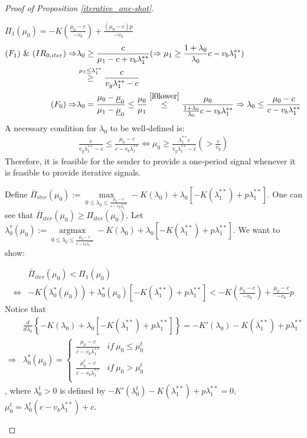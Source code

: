 \documentclass[11pt]{extarticle}
\DeclareMathOperator*{\argmax}{argmax}
\newcommand{\lra}{\Leftrightarrow}
\newcommand{\ra}{\Rightarrow}
\begin{document}
\begin{proof}[Proof of Proposition \ref{iterative_one-shot}]
\begin{enumerate}[i)]
		$\Pi_1(\mu_0) = -K(\frac{\mu_0-c}{-v_b})+\frac{(\mu_0-c)p}{-v_b}$
		\vspace{-10pt}	
		\begingroup
		\allowdisplaybreaks
		\begin{align}
		(F_1)~\&~(IR_{0,iter}) \ra& \lambda_0 \geq \frac{c}{\mu_1-c+v_b\lambda_1^{**}} (\ra \mu_1 \geq \frac{1+\lambda_{0}}{\lambda_{0}}c-v_b \lambda_{1}^{**}) \label{l0lower}\\
		&\overset{\mu_1 \leq \lambda_1^{**}}{\geq} \frac{c}{v_g\lambda_1^{**}-c} \nonumber \\
		(F_0) \ra& \lambda_0 = \frac{\mu_0-\underline{\mu}_0}{\mu_1-\underline{\mu}_0} \leq \frac{\mu_0}{\mu_1} \overset{\eqref{l0lower}}\leq \frac{\mu_0}{\frac{1+\lambda_0}{\lambda_0} c  - v_b \lambda_1^{**}} \ra \lambda_0 \leq \frac{\mu_0-c}{c-v_b\lambda_1^{**}} \nonumber 
		\end{align}
		\endgroup
		A necessary condition for $\lambda_0$ to be well-defined is:
		\begin{align}
		\frac{c}{v_g\lambda_1^{**}-c} \leq \frac{\mu_0-c}{c-v_b\lambda_1^{**}} \lra \mu_0 \geq \frac{\lambda_1^{**} c}{v_g\lambda_1^{**}-c} (>\frac{c}{v_g}) \nonumber 
		\end{align}
		Therefore, it is feasible for the sender to provide a one-period signal whenever it is feasible to provide iterative signals.
		
		Define $\bar{\Pi}_{iter}(\mu_0):= \max \limits_{0\leq \lambda_0 \leq \frac{\mu_0-c}{c-v_b\lambda_1^{**}}} -K(\lambda_0) + \lambda_0 \left[-K(\lambda_1^{**})+p \lambda_1^{**} \right]$. One can see that $\bar{\Pi}_{iter}(\mu_0) \geq \Pi_{iter}(\mu_0)$. Let $\lambda_0^*(\mu_0) := \argmax \limits_{0\leq \lambda_0 \leq \frac{\mu_0-c}{c-v_b\lambda_1^{**}}} -K(\lambda_0) + \lambda_0 \left[-K(\lambda_1^{**})+p \lambda_1^{**} \right]$. We want to show:
		\vspace{-20pt}
		
		\begin{align}
		&\bar{\Pi}_{iter}(\mu_0) < \Pi_1(\mu_0) \nonumber\\
		\lra &-K(\lambda_0^*(\mu_0)) + \lambda_0^*(\mu_0) \left[-K(\lambda_1^{**})+p \lambda_1^{**} \right] < -K(\frac{\mu_0-c}{-v_b})+\frac{\mu_0-c}{-v_b}p \label{comparison1iter}
		\end{align}
		Notice that
		\vspace{-35pt}
		\begin{align*}
		&\frac{d}{d \lambda_0}\left\{ -K(\lambda_0) + \lambda_0 \left[-K(\lambda_1^{**})+p \lambda_1^{**} \right] \right\} = -K'(\lambda_0) -K(\lambda_1^{**})+p \lambda_1^{**} \\
		\ra& \lambda_0^*(\mu_0) =\begin{cases}
		\frac{\mu_0-c}{c-v_b\lambda_1^{**}} &if~\mu_0 \leq \mu_0^t\\
		\frac{\mu_0^t-c}{c-v_b\lambda_1^{**}} &if~\mu_0 > \mu_0^t\\
		\end{cases} 
		\end{align*}
		, where $\lambda_0^t > 0$ is defined by $-K'(\lambda_0^t) -K(\lambda_1^{**})+p \lambda_1^{**} = 0,$ $\mu_0^t = \lambda_0^t (c-v_b\lambda_1^{**}) + c$.
		

\end{enumerate}
\end{proof}
\end{document}
